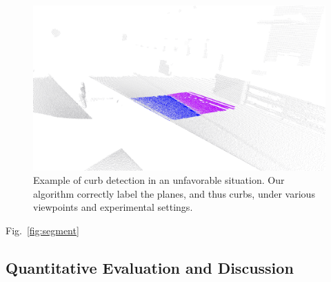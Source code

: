 \begin{figure}[t]
\centering
\includegraphics[width=\columnwidth]{fig/special.eps}
\caption{Example of curb detection in an unfavorable situation. Our algorithm
correctly label the planes, and thus curbs, under various viewpoints and
experimental settings.}
\label{fig:special}
\end{figure}

Fig.~\ref{fig:segment}

\subsection{Quantitative Evaluation and Discussion}

